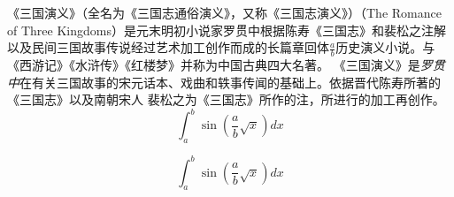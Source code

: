 《三国演义》（全名为《三国志通俗演义》，又称《三国志演义》）（The Romance of Three Kingdoms）是元末明初小说家罗贯中根据陈寿《三国志》和裴松之注解以及民间三国故事传说经过艺术加工创作而成的长篇章回体$\frac{a}{b}$历史演义小说。与《西游记》《水浒传》《红楼梦》并称为中国古典四大名著。
《三国演义》是\emph{罗贯中}在有关{\sffamily 三国故事的宋元话本}、戏曲和轶事传闻的基础上。依据晋代陈寿所著的《三国志》以及南朝宋人%
%
裴松之为《三国志》所作的注，所进行的加工再创作。
\begin{equation}
    \int_a^b\sin(\frac{a}{b}\sqrt{x})dx
\end{equation}

\begin{equation}
    \int_a^b\sin(\frac{a}{b}\sqrt{x})dx
\end{equation}

